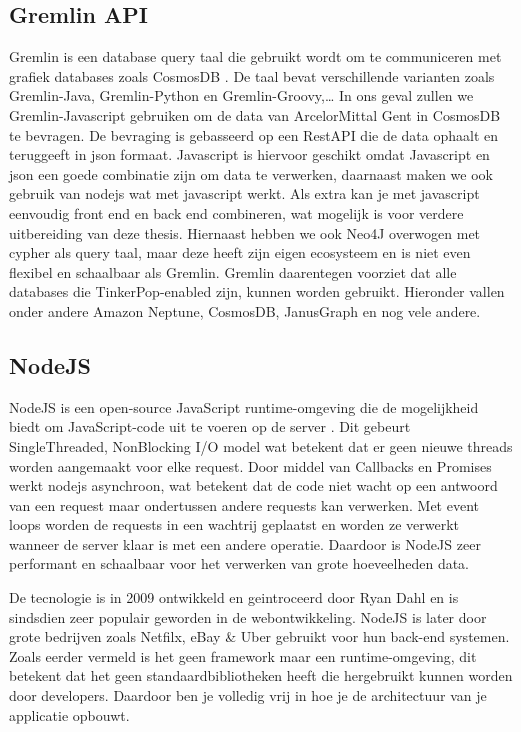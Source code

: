 \subsection{Gremlin API}
Gremlin is een database query taal die gebruikt wordt om te communiceren met grafiek databases zoals CosmosDB \autocite{Tinkerpop2023}.\@
De taal bevat verschillende varianten zoals Gremlin-Java, Gremlin-Python en Gremlin-Groovy,\dots
In ons geval zullen we Gremlin-Javascript gebruiken om de data van ArcelorMittal Gent in CosmosDB te bevragen. De bevraging is gebasseerd op een RestAPI die de data ophaalt en teruggeeft in json formaat.
Javascript is hiervoor geschikt omdat Javascript en json een goede combinatie zijn om data te verwerken, daarnaast maken we ook gebruik van nodejs wat met javascript werkt. 
Als extra kan je met javascript eenvoudig front end en back end combineren, wat mogelijk is voor verdere uitbereiding van deze thesis.
Hiernaast hebben we ook Neo4J overwogen met cypher als query taal, maar deze heeft zijn eigen ecosysteem en is niet even flexibel en schaalbaar als Gremlin.
Gremlin daarentegen voorziet dat alle databases die TinkerPop-enabled zijn, kunnen worden gebruikt. Hieronder vallen onder andere Amazon Neptune, CosmosDB, JanusGraph en nog vele andere.\autocite{Tinkerpop2023a}

\subsection{NodeJS}
NodeJS is een open-source JavaScript runtime-omgeving die de mogelijkheid biedt om JavaScript-code uit te voeren op de server \autocite{NodeJS2022}.
Dit gebeurt Single\-Threaded, Non\-Blocking I/O model wat betekent dat er geen nieuwe threads worden aangemaakt voor elke request.
Door middel van Callbacks en Promises werkt nodejs asynchroon, wat betekent dat de code niet wacht op een antwoord van een request maar ondertussen andere requests kan verwerken.
Met event loops worden de requests in een wachtrij geplaatst en worden ze verwerkt wanneer de server klaar is met een andere operatie.
Daardoor is NodeJS zeer performant en schaalbaar voor het verwerken van grote hoeveelheden data.

De tecnologie is in 2009 ontwikkeld en geintroceerd door Ryan Dahl en is sindsdien zeer populair geworden in de webontwikkeling. 
NodeJS is later door grote bedrijven zoals Netfilx, eBay \& Uber gebruikt voor hun back-end systemen.
Zoals eerder vermeld is het geen framework maar een runtime-omgeving, dit betekent dat het geen standaardbibliotheken heeft die hergebruikt kunnen worden door developers.
Daardoor ben je volledig vrij in hoe je de architectuur van je applicatie opbouwt.

